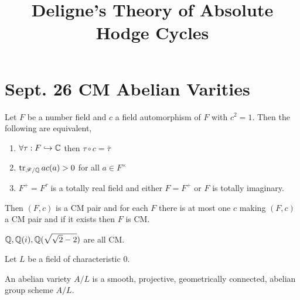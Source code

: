 \documentclass[12pt]{article}
\begin{document}
\title{Deligne's Theory of Absolute Hodge Cycles}
\maketitle

\section{Sept. 26 CM Abelian Varities}

\begin{prop}
Let $F$ be a number field and $c$ a field automorphism of $F$ with $c^2 = 1$. Then the following are equivalent,
\begin{enumerate}
\item $\forall \tau : F \hookrightarrow \mathbb{C}$ then $\tau \circ c = \bar{\tau}$
\item $\operatorname{\mathrm{tr}}_{\mathscr{F}/\mathbb{Q}}{a c(a)} > 0$ for all $a \in F^\times$
\item $F^{+} = F^{\tau}$ is a totally real field and either $F = F^+$ or $F$ is totally imaginary.
\end{enumerate}
Then $(F, c)$ is a CM pair and for each $F$ there is at most one $c$ making $(F, c)$ a CM pair and if it exists then $F$ is CM. 
\end{prop}

\begin{example}
$\mathbb{Q}, \mathbb{Q}(i), \mathbb{Q}(\sqrt{\sqrt{2} - 2})$ are all CM. 
\end{example}

Let $L$ be a field of characteristic $0$. 

\begin{defn}
An abelian variety $A/L$ is a smooth, projective, geometrically connected, abelian group scheme $A/L$. 
\end{defn}
\end{document}
